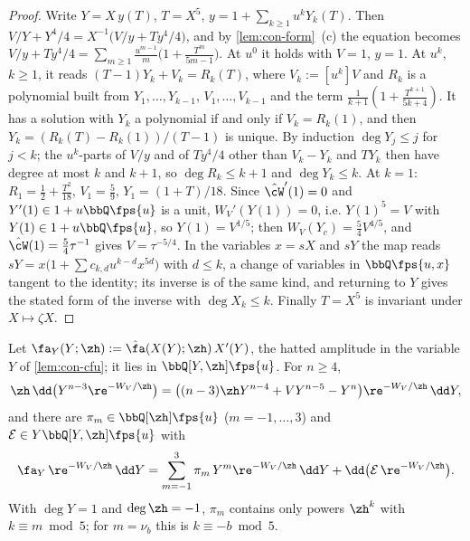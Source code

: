 \begin{proof}
Write $Y=X\,y(T)$, $T=X^5$, $y=1+\sum_{k\geq1}u^kY_k(T)$. Then $V/Y+Y^4/4=X^{-1}\bigl(V/y+Ty^4/4\bigr)$, and by \cref{lem:con-form}~(c) the equation becomes $V/y+Ty^4/4=\sum_{m\geq1}\frac{u^{m-1}}m\bigl(1+\frac{T^m}{5m-1}\bigr)$. At $u^0$ it holds with $V=1$, $y=1$. At $u^k$, $k\geq1$, it reads $(T-1)Y_k+V_k=R_k(T)$, where $V_k:=[u^k]V$ and $R_k$ is a polynomial built from $Y_1,\dots,Y_{k-1}$, $V_1,\dots,V_{k-1}$ and the term $\frac1{k+1}(1+\frac{T^{k+1}}{5k+4})$. It has a solution with $Y_k$ a polynomial if and only if $V_k=R_k(1)$, and then $Y_k=(R_k(T)-R_k(1))/(T-1)$ is unique. By induction $\deg Y_j\leq j$ for $j<k$; the $u^k$-parts of $V/y$ and of $Ty^4/4$ other than $V_k-Y_k$ and $TY_k$ then have degree at most $k$ and $k+1$, so $\deg R_k\leq k+1$ and $\deg Y_k\leq k$. At $k=1$: $R_1=\frac12+\frac{T^2}{18}$, $V_1=\frac59$, $Y_1=(1+T)/18$. Since $\hat\cW'(1)=0$ and $Y'(1)\in1+u\bbQ\fps{u}$ is a unit, $W_V'(Y(1))=0$, i.e. $Y(1)^5=V$ with $Y(1)\in1+u\bbQ\fps{u}$, so $Y(1)=V^{1/5}$; then $W_V(Y_c)=\frac54V^{4/5}$, and $\hat\cW(1)=\frac54\tau^{-1}$ gives $V=\tau^{-5/4}$. In the variables $x=sX$ and $sY$ the map reads $sY=x\bigl(1+\sum c_{k,d}u^{k-d}x^{5d}\bigr)$ with $d\leq k$, a change of variables in $\bbQ\fps{u,x}$ tangent to the identity; its inverse is of the same kind, and returning to $Y$ gives the stated form of the inverse with $\deg X_k\leq k$. Finally $T=X^5$ is invariant under $X\mapsto\zeta X$.
\end{proof}

\begin{lem}
\label{lem:con-red}
Let $\fa_Y(Y;\zh):=\hat\fa(X(Y);\zh)\,X'(Y)$, the hatted amplitude in the variable $Y$ of \cref{lem:con-cfu}; it lies in $\bbQ[Y,\zh]\fps{u}$. For $n\geq4$,
\[
\zh\,\dd\bigl(Y^{n-3}\re^{-W_V/\zh}\bigr)=\bigl((n-3)\zh Y^{n-4}+VY^{n-5}-Y^n\bigr)\re^{-W_V/\zh}\,\dd Y,
\]
and there are $\pi_m\in\bbQ[\zh]\fps{u}$ ($m=-1,\dots,3$) and $\mathcal E\in Y\bbQ[Y,\zh]\fps{u}$ with
\[
\fa_Y\,\re^{-W_V/\zh}\,\dd Y=\sum_{m=-1}^{3}\pi_m\,Y^m\re^{-W_V/\zh}\,\dd Y+\dd\bigl(\mathcal E\,\re^{-W_V/\zh}\bigr).
\]
With $\deg Y=1$ and $\deg\zh=-1$, $\pi_m$ contains only powers $\zh^k$ with $k\equiv m\bmod5$; for $m=\nu_b$ this is $k\equiv-b\bmod5$.
\end{lem}

